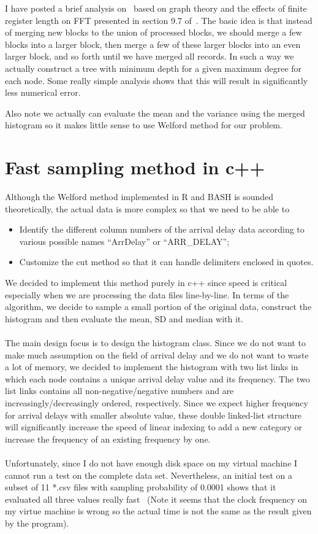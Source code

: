 \documentclass{article}
\begin{document}
I have posted a brief analysis on~\cite{ErrorAnalysis} based on graph theory and the effects of finite register length on FFT presented in section 9.7 of~\cite{oppenheim2006discrete}. The basic idea is that instead of merging new blocks to the union of processed blocks, we should merge a few blocks into a larger block, then merge a few of these larger blocks into an even larger block, and so forth until we have merged all records. In such a way we actually construct a tree with minimum depth for a given maximum degree for each node. Some really simple analysis shows that this will result in significantly less numerical error.

Also note we actually can evaluate the mean and the variance using the merged histogram so it makes little sense to use Welford method for our problem.

\section{Fast sampling method in c++}
Although the Welford method implemented in R and BASH is sounded theoretically, the actual data is more complex so that we need to be able to 
\begin{itemize}
    \item Identify the different column numbers of the arrival delay data according to various possible names ``ArrDelay'' or ``ARR\_DELAY'';
    \item Customize the cut method so that it can handle delimiters enclosed in quotes.
\end{itemize}
We decided to implement this method purely in c++ since speed is critical especially when we are processing the data files line-by-line. In terms of the algorithm, we decide to sample a small portion of the original data, construct the histogram and then evaluate the mean, SD and median with it.
\\\\
The main design focus is to design the histogram class. Since we do not want to make much assumption on the field of arrival delay and we do not want to waste a lot of  memory, we decided to implement the histogram with two list links in which each node contains a unique arrival delay value and its frequency. The two list links contains all non-negative/negative numbers and are increasingly/decreasingly ordered, respectively. Since we expect higher frequency for arrival delays with smaller absolute value, these double linked-list structure will significantly increase the speed of linear indexing to add a new category or increase the frequency of an existing frequency by one.
\\\\
Unfortunately, since I do not have enough disk space on my virtual machine I cannot run a test on the complete data set. Nevertheless, an initial test on a subset of 11 *.csv files with sampling probability of 0.0001 shows that it evaluated all three values really fast~\cite{FastSample} (Note it seems that the clock frequency on my virtue machine is wrong so the actual time is not the same as the result given by the program).
\end{document}
